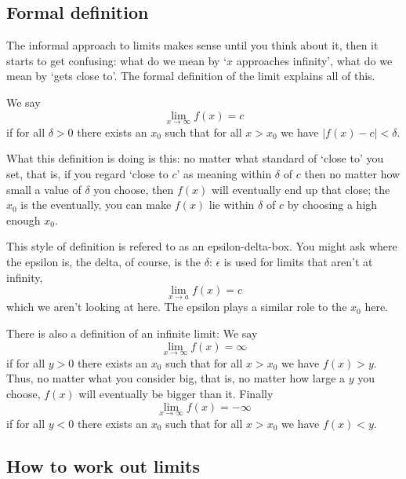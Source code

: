 \documentclass[11pt,a4paper]{scrartcl}
\begin{document}
\subsection*{Formal definition}

The informal approach to limits makes sense until you think about it,
then it starts to get confusing: what do we mean by \lq{}$x$
approaches infinity\rq{}, what do we mean by \lq{}gets close
to\rq{}. The formal definition of the limit explains all of this. 

We say
\begin{equation}
\lim_{x\rightarrow \infty}f(x)=c
\end{equation}
if for all $\delta>0$ there exists an $x_0$ such that for all $x>x_0$
we have $|f(x)-c|<\delta$.

What this definition is doing is this: no matter what standard of
\lq{}close to\rq{} you set, that is, if you regard \lq{}close to
$c$\rq{} as meaning within $\delta$ of $c$ then no matter how small a
value of $\delta$ you choose, then $f(x)$ will eventually end up that
close; the $x_0$ is the eventually, you can make $f(x)$ lie within
$\delta$ of $c$ by choosing a high enough $x_0$.

This style of definition is refered to as an epsilon-delta-box. You
might ask where the epsilon is, the delta, of course, is the $\delta$:
$\epsilon$ is used for limits that aren't at infinity, 
\begin{equation}
\lim_{x\rightarrow a}f(x)=c
\end{equation}
which we aren't looking at here. The epsilon plays a similar role to
the $x_0$ here.

There is also a definition of an infinite limit:
We say
\begin{equation}
\lim_{x\rightarrow \infty}f(x)=\infty
\end{equation}
if for all $y>0$ there exists an $x_0$ such that for all $x>x_0$
we have $f(x)>y$. Thus, no matter what you consider big, that is, no matter how large a $y$ you choose, $f(x)$ will eventually be bigger than it. Finally
\begin{equation}
\lim_{x\rightarrow \infty}f(x)=-\infty
\end{equation}
if for all $y<0$ there exists an $x_0$ such that for all $x>x_0$
we have $f(x)<y$.

\subsection*{How to work out limits}
\end{document}
